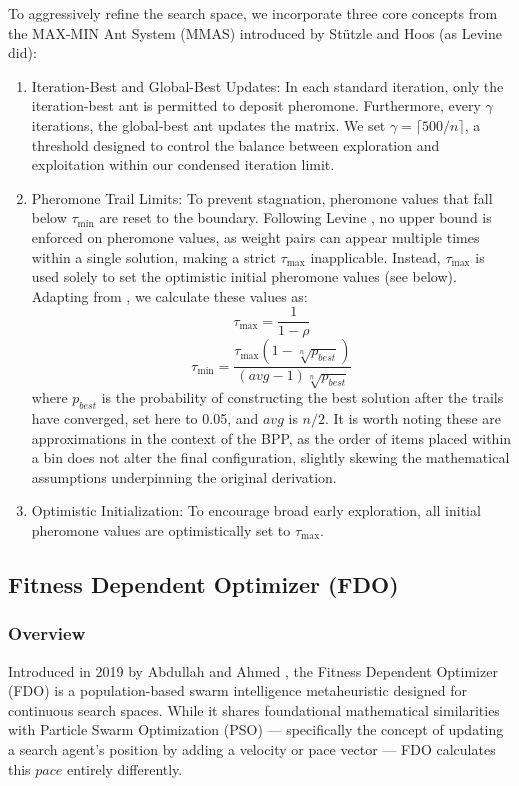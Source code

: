 \documentclass[11pt]{article}
\begin{document}
To aggressively refine the search space, we incorporate three core concepts 
from the MAX-MIN Ant System (MMAS) introduced by Stützle and Hoos 
\cite{stuetzle} (as Levine did):
\begin{enumerate}
    \item Iteration-Best and Global-Best Updates: In each standard iteration, 
    only the iteration-best ant is permitted to deposit pheromone. Furthermore, 
    every $\gamma$ iterations, the global-best ant updates the matrix. We set 
    $\gamma = \lceil 500/n \rceil$, a threshold designed to control the balance 
    between exploration and exploitation within our condensed iteration limit.
    \item Pheromone Trail Limits: To prevent stagnation, pheromone values that fall below $\tau_{\min}$ are reset to the boundary. Following Levine \cite{levine}, no upper bound is enforced on pheromone values, as weight pairs can appear multiple times within a single solution, making a strict $\tau_{\max}$ inapplicable. Instead, $\tau_{\max}$ is used solely to set the optimistic initial pheromone values (see below). Adapting from \cite{stuetzle}, we calculate these values as:
    $$\tau_{\max} = \frac{1}{1-\rho}$$
    $$\tau_{\min} = \frac{\tau_{\max}\left(1 - \sqrt[n]{p_{best}}\right)}{(avg - 1)\sqrt[n]{p_{best}}}$$
    where $p_{best}$ is the probability of constructing the best solution after 
    the trails have converged, set here to 0.05, and $avg$ is $n/2$. It is 
    worth noting these are approximations in the context of the BPP, as 
    the order of items placed within a bin does not alter the final 
    configuration, slightly skewing the mathematical assumptions underpinning 
    the original derivation.
    \item Optimistic Initialization: To encourage broad early exploration, all 
    initial pheromone values are optimistically set to $\tau_{\max}$.
\end{enumerate}

\subsection{Fitness Dependent Optimizer (FDO)}
\subsubsection{Overview}

Introduced in 2019 by Abdullah and Ahmed \cite{abdullah}, the Fitness
Dependent Optimizer (FDO) is a population-based swarm intelligence
metaheuristic designed for continuous search spaces. While it shares
foundational mathematical similarities with Particle Swarm Optimization
(PSO) --- specifically the concept of updating a search agent's position
by adding a velocity or pace vector --- FDO calculates this $pace$
entirely differently.
\end{document}
